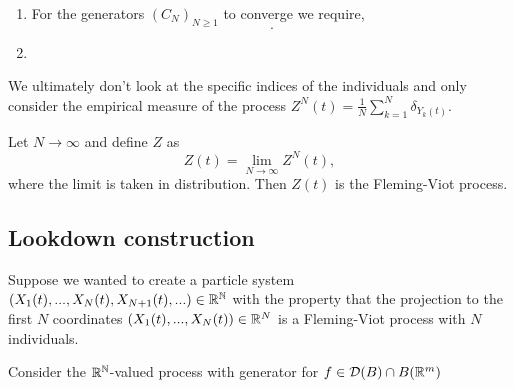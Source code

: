 \documentclass{article}
\begin{document}
\begin{hyp}
    \begin{enumerate}
        \item For the generators $(C_N)_{N\geq1}$ to converge we require,
        $$.$$
        \item 
    \end{enumerate}
\end{hyp}


We ultimately don't look at the specific indices of the individuals and only consider the empirical measure of the process $Z^N(t)=\frac{1}{N}\sum_{k=1}^N\delta_{Y_k(t)}$.

Let $N\rightarrow\infty$ and define $Z$ as
\begin{equation*}
    Z(t)=\lim_{N\rightarrow\infty}Z^N(t),
\end{equation*}
where the limit is taken in distribution.
Then $Z(t)$ is the Fleming-Viot process.
\subsection{Lookdown construction}
Suppose we wanted to create a particle system $(X_1(t),...,X_N(t),X_{N+1}(t),...)\in\mathbb{R}^{{\mathbb N}}$ with the property that the projection to the first $N$ coordinates $(X_1(t),...,X_N(t))\in\mathbb{R}^N$ is a Fleming-Viot process with $N$ individuals. 

Consider the $\mathbb{R}^{{\mathbb N}}$-valued process with generator for $f\in\mathcal D(B)\cap B(\mathbb{R}^m)$
\end{document}
